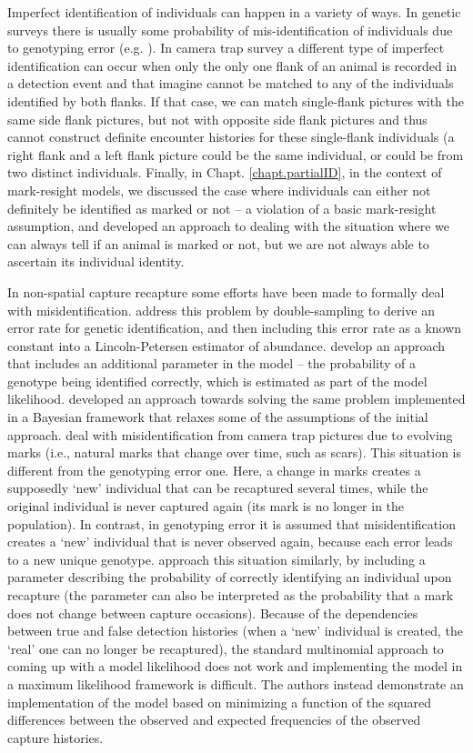 Imperfect identification of individuals can happen in a variety of
ways. In genetic surveys there is usually some probability of
mis-identification of individuals due to genotyping error
(e.g. \citet{lukacs_burnham:2005}). In camera trap survey a different
type of imperfect identification can occur when only the only one
flank of an animal is recorded in a detection event and that imagine
cannot be matched to any of the individuals identified by both
flanks. If that case, we can match single-flank pictures with the same
side flank pictures, but not with opposite side flank pictures and
thus cannot construct definite encounter histories for these
single-flank individuals (a right flank and a left flank picture could
be the same individual, or could be from two distinct
individuals. Finally, in Chapt. \ref{chapt.partialID}, in the context
of mark-resight models, we discussed the case where individuals can
either not definitely be identified as marked or not -- a violation of
a basic mark-resight assumption, and developed an approach to dealing
with the situation where we can always tell if an animal is marked or
not, but we are not always able to ascertain its individual identity.

In non-spatial capture recapture some efforts have been made to
formally deal with misidentification. \citet{stevick_etal:2001}
address this problem by double-sampling to derive an error rate for
genetic identification, and then including this error rate as a known
constant into a Lincoln-Petersen estimator of
abundance. \citet{lukacs_burnham:2005} develop an approach that
includes an additional parameter in the model -- the probability of a
genotype being identified correctly, which is estimated as part of the
model likelihood. \citet{link_etal:2010} developed an approach towards
solving the same problem implemented in a Bayesian framework that
relaxes some of the assumptions of the initial approach.
\citet{yoshizaki_etal:2009} deal with misidentification from camera
trap pictures due to evolving marks (i.e., natural marks that change
over time, such as scars). This situation is different from the
genotyping error one. Here, a change in marks creates a supposedly
`new' individual that can be recaptured several times, while the
original individual is never captured again (its mark is no longer in
the population). In contrast, in genotyping error it is assumed that
misidentification creates a `new' individual that is never observed
again, because each error leads to a new unique
genotype. \citet{yoshizaki_etal:2009} approach this situation
similarly, by including a parameter describing the probability of
correctly identifying an individual upon recapture (the parameter can
also be interpreted as the probability that a mark does not change
between capture occasions). Because of the dependencies between true
and false detection histories (when a `new' individual is created, the
`real' one can no longer be recaptured), the standard multinomial
approach to coming up with a model likelihood does not work and
implementing the model in a maximum likelihood framework is
difficult. The authors instead demonstrate an implementation of the
model based on minimizing a function of the squared differences
between the observed and expected frequencies of the observed capture
histories.


